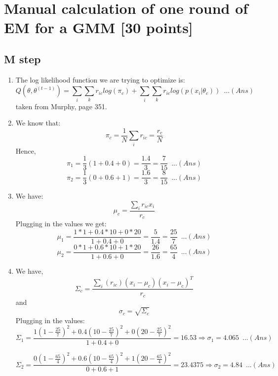 \documentclass[letterpaper]{article}
\begin{document}
\section{Manual calculation of one round of EM for a GMM [30 points]}
\subsection*{M step}
\begin{enumerate}
\item The log likelihood function we are trying to optimize is:
\begin{equation}
Q(\theta, \theta^{(t-1)}) = \sum_{i}{\sum_{k}{r_{ic}log(\pi_{c})}}  + \sum_{i}{\sum_{k}{r_{ic}log(p(x_i|\theta_c))}} \,\,\, ...(Ans)
\end{equation}
taken from Murphy, page 351.
\item
We know that:
\begin{equation}
\pi_c = \frac{1}{N}\sum_i{r_{ic}} = \frac{r_c}{N}
\end{equation}
Hence,
\begin{equation}
\pi_1 = \frac{1}{3}(1+0.4+0) = \frac{1.4}{3} = \frac{7}{15} \,\,\, ...(Ans)
\end{equation}
\begin{equation}
\pi_2 = \frac{1}{3}(0+0.6+1) = \frac{1.6}{3} = \frac{8}{15} \,\,\, ...(Ans)
\end{equation}
\item
We have: 
\begin{equation}
\mu_c = \frac{\sum_i{r_{ic}x_i}}{r_c}
\end{equation}
Plugging in the values we get:
\begin{equation}
\mu_1 = \frac{1*1 + 0.4*10 + 0*20}{1 + 0.4 + 0} = \frac{5}{1.4} = \frac{25}{7} \,\,\,...(Ans)
\end{equation}
\begin{equation}
\mu_2 = \frac{0*1 + 0.6*10 + 1*20}{1 + 0.6 + 0} = \frac{26}{1.6} = \frac{65}{4} \,\,\,...(Ans)
\end{equation}
\item
We have,
\begin{equation}
\Sigma_c = \frac{\sum_i{(r_{ic})(x_i-\mu_c)(x_i - \mu_c)^T}}{r_c}
\end{equation}
and
\begin{equation}
\sigma_c = \sqrt{\Sigma_c}
\end{equation}
Plugging in the values:
\begin{equation}
\Sigma_1 = \frac{1(1-\frac{25}{7})^2 + 0.4(10-\frac{25}{7})^2 + 0(20-\frac{25}{7})^2}{1 + 0.4 + 0} = 16.53 \Rightarrow \sigma_1 = 4.065\,\,\,...(Ans)
\end{equation}

\begin{equation}
\Sigma_2 = \frac{0(1-\frac{65}{4})^2+0.6(10-\frac{65}{4})^2+ 1(20-\frac{65}{4})^2}{0 + 0.6 + 1} = 23.4375 \Rightarrow \sigma_2 = 4.84 \,\,\,...(Ans)
\end{equation}

\end{enumerate}
\end{document}
